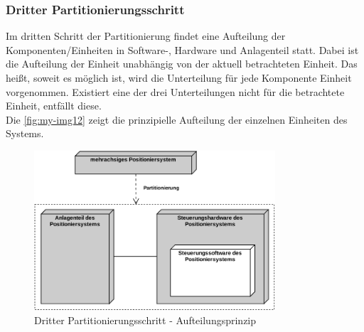 \documentclass[../../../Bachelorarbeit.tex]{subfiles}
\begin{document}
\subsubsection{Dritter Partitionierungsschritt}
Im dritten Schritt der Partitionierung findet eine Aufteilung der Komponenten/Einheiten in Software-, Hardware und Anlagenteil statt. Dabei ist die Aufteilung der Einheit unabhängig von der aktuell betrachteten Einheit. Das heißt, soweit es möglich ist, wird die Unterteilung für jede Komponente \bzw Einheit vorgenommen. Existiert eine der drei Unterteilungen nicht für die betrachtete Einheit, entfällt diese.\\
Die \autoref{fig:my-img12} zeigt die prinzipielle Aufteilung der einzelnen Einheiten des Systems.

\begin{figure}[H]
    \centering
    \includegraphics[width=0.8\textwidth]{Images/dritter_schritt.pdf}
    \caption[Dritter Partitionierungsschritt]{Dritter Partitionierungsschritt - Aufteilungsprinzip}
    \label{fig:my-img12}
\end{figure}
\end{document}
